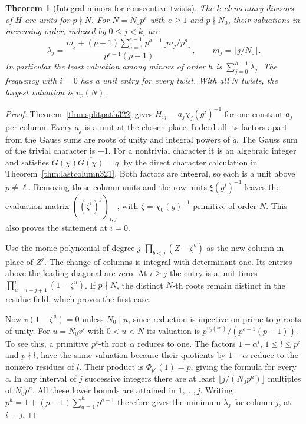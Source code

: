 \documentclass[a4paper,11pt]{article}
\newtheorem{theorem}[proposition]{Theorem}
\theoremstyle{definition}
\theoremstyle{remark}
\numberwithin{equation}{section}
\begin{document}
\begin{theorem}[Integral minors for consecutive twists]\leavevmode
\label{thm:tamedivisors322}
The \(k\) elementary divisors of \(H\) are units for \(p\nmid N\).
For \(N=N_0p^e\) with \(e\ge1\) and \(p\nmid N_0\), their
valuations in increasing order, indexed by \(0\le j<k\), are
\[
 \lambda_j=\frac{m_j+(p-1)\sum_{a=1}^{e-1}
                   p^{a-1}\lfloor m_j/p^a\rfloor}
                   {p^{e-1}(p-1)},\qquad m_j=\lfloor j/N_0\rfloor .
\]
In particular the least valuation among minors of order \(h\)
is \(\sum_{j=0}^{h-1}\lambda_j\). The frequency with \(i=0\)
has a unit entry for every twist. With all \(N\) twists, the
largest valuation is \(v_p(N)\).
\end{theorem}
\begin{proof}
Theorem~\ref{thm:splitpath322} gives
\(H_{ij}=a_j\chi_j(g^i)^{-1}\) for one constant \(a_j\)
per column. Every \(a_j\) is a unit at the chosen place.
Indeed all its factors apart from the Gauss sums are roots
of unity and integral powers of \(q\). The Gauss sum of the
trivial character is \(-1\). For a nontrivial character it
is an algebraic integer and satisfies
\(G(\chi)\overline{G(\chi)}=q\), by the direct character
calculation in Theorem~\ref{thm:lastcolumn321}. Both factors
are integral, so each is a unit above \(p\ne\ell\). Removing
these column units and the row units \(\xi(g^i)^{-1}\)
leaves the evaluation matrix \(((\zeta^i)^j)_{i,j}\), with
\(\zeta=\chi_0(g)^{-1}\) primitive of order \(N\). This also
proves the statement at \(i=0\).

Use the monic polynomial of degree \(j\)
\(\prod_{b<j}(Z-\zeta^b)\) as the new column in place of
\(Z^j\). The change of columns is integral with determinant
one. Its entries above the leading diagonal are zero. At
\(i\ge j\) the entry is a unit times
\(\prod_{u=i-j+1}^{i}(1-\zeta^u)\).
If \(p\nmid N\), the distinct \(N\)-th roots remain distinct
in the residue field, which proves the first case.

Now \(v(1-\zeta^u)=0\) unless \(N_0\mid u\), since
reduction is injective on prime-to-\(p\) roots of unity.
For \(u=N_0v'\) with \(0<u<N\) its valuation is
\(p^{v_p(v')}/(p^{e-1}(p-1))\). To see this, a primitive
\(p^c\)-th root \(\alpha\) reduces to one. The factors
\(1-\alpha^l\), \(1\le l\le p^c\) and \(p\nmid l\), have
the same valuation because their quotients by \(1-\alpha\)
reduce to the nonzero residues of \(l\). Their product is
\(\Phi_{p^c}(1)=p\), giving the formula for every \(c\).
In any interval of \(j\) successive integers there are at
least \(\lfloor j/(N_0p^a)\rfloor\) multiples of \(N_0p^a\).
All these lower bounds are attained in \(1,\ldots,j\).
Writing \(p^h=1+(p-1)\sum_{a=1}^{h}p^{a-1}\) therefore
gives the minimum \(\lambda_j\) for column \(j\), at \(i=j\).


\end{proof}
\end{document}
